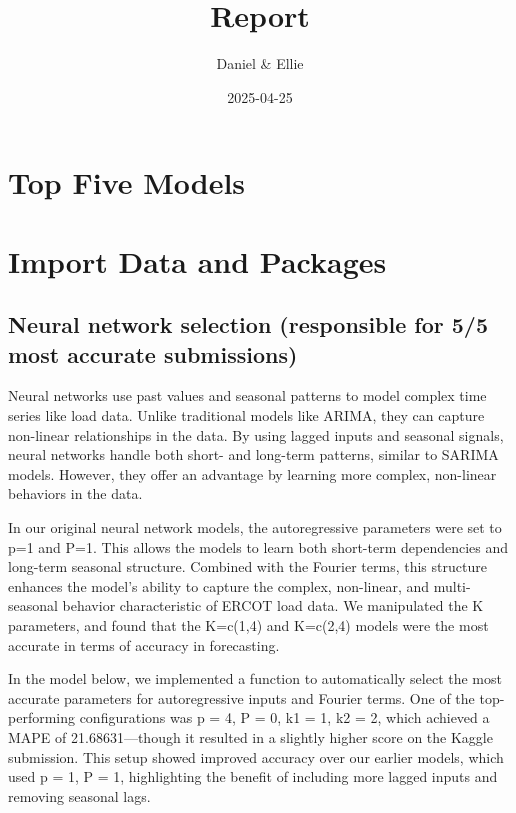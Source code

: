\documentclass[
]{article}
\title{Report}
\author{Daniel \& Ellie}
\date{2025-04-25}
\begin{document}
\maketitle

\section{Top Five Models}\label{top-five-models}

\section{Import Data and Packages}\label{import-data-and-packages}

\subsection{Neural network selection (responsible for 5/5 most accurate
submissions)}\label{neural-network-selection-responsible-for-55-most-accurate-submissions}

Neural networks use past values and seasonal patterns to model complex
time series like load data. Unlike traditional models like ARIMA, they
can capture non-linear relationships in the data. By using lagged inputs
and seasonal signals, neural networks handle both short- and long-term
patterns, similar to SARIMA models. However, they offer an advantage by
learning more complex, non-linear behaviors in the data.

In our original neural network models, the autoregressive parameters
were set to p=1 and P=1. This allows the models to learn both short-term
dependencies and long-term seasonal structure. Combined with the Fourier
terms, this structure enhances the model's ability to capture the
complex, non-linear, and multi-seasonal behavior characteristic of ERCOT
load data. We manipulated the K parameters, and found that the K=c(1,4)
and K=c(2,4) models were the most accurate in terms of accuracy in
forecasting.

In the model below, we implemented a function to automatically select
the most accurate parameters for autoregressive inputs and Fourier
terms. One of the top-performing configurations was p = 4, P = 0, k1 =
1, k2 = 2, which achieved a MAPE of 21.68631---though it resulted in a
slightly higher score on the Kaggle submission. This setup showed
improved accuracy over our earlier models, which used p = 1, P = 1,
highlighting the benefit of including more lagged inputs and removing
seasonal lags.
\end{document}
